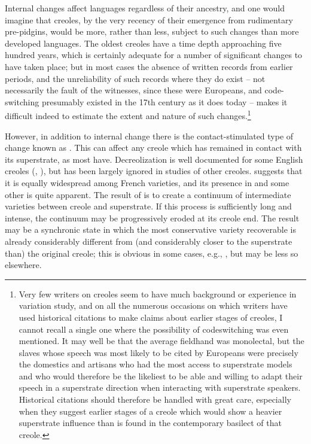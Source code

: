 Internal changes affect languages regardless of their ancestry, and one would imagine that creoles, by the very recency of their emergence from rudimentary pre-pidgins, would be more, rather than less, subject to such changes than more developed languages. The oldest creoles have a time depth approaching five hundred years, which is certainly adequate for a number of significant changes to have taken place; but in most cases the absence of written records from earlier periods, and the unreliability of such records where they do exist -- not necessarily the fault of the witnesses, since these were Europeans, and code-switching presumably existed in the 17th century as it does today -- makes it difficult indeed to estimate the extent and nature of such changes.\footnote{Very few writers on creoles seem to have much background or experience in variation study, and on all the numerous occasions on which writers have used historical citations to make claims about earlier stages of creoles, I cannot recall a single one where the possi\-bility of codeswitching was even mentioned. It may well be that the average fieldhand was monolectal, but the slaves whose speech was most likely to be cited by Europeans were precisely the domestics and artisans who had the most access to superstrate models and who would therefore be the likeliest to be able and willing to adapt their speech in a superstrate direction when interacting with superstrate speakers. Historical citations should therefore be handled with great care, especially when they suggest earlier stages of a creole which would show a heavier superstrate influence than is found in the con\-temporary basilect of that creole.}

However, in addition to internal change there is the contact-stimulated type of change known as . This can affect any creole which has remained in contact with its superstrate, as most have. Decreolization is well documented for some English creoles
(\citealt{DeCamp1971}, \citealt{Bickerton1973a,Bickerton1975}), but has been largely ignored in studies of other creoles. \citet{Valdman1973} suggests that it is equally widespread among French varieties, and its presence in  and some other  is quite apparent. The result of  is to create a continuum of intermediate varieties be\-tween creole and superstrate. If this process is sufficiently long and intense, the continuum may be progressively eroded at its creole end. The result may be a synchronic state in which the most conservative variety recoverable is already considerably different from (and con\-siderably closer to the superstrate than) the original creole; this is obvious in some cases, e.g., , but may be less so elsewhere.

